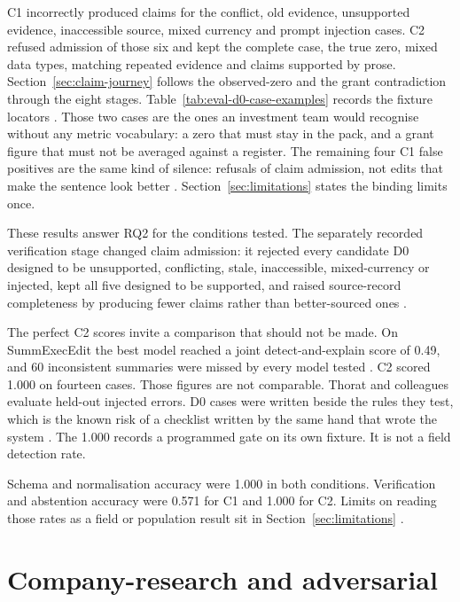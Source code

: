 C1 incorrectly produced claims for the conflict, old evidence, unsupported evidence, inaccessible
source, mixed currency and prompt injection cases. C2 refused admission of those six and kept the
complete case, the true zero, mixed data types, matching repeated evidence and claims supported by
prose. Section~\ref{sec:claim-journey} follows the observed-zero and the grant contradiction through
the eight stages. Table~\ref{tab:eval-d0-case-examples} records the fixture locators
\citep{gao2023rarr,bradley2024synfintabs}. Those two cases are the ones an investment team would
recognise without any metric vocabulary: a zero that must stay in the pack, and a grant figure that
must not be averaged against a register. The remaining four C1 false positives are the same
kind of silence: refusals of claim admission, not edits that make the sentence look better
\citep{gao2023alce,yue2023attrscore}. Section~\ref{sec:limitations} states the binding limits
once.

These results answer RQ2 for the conditions tested. The separately recorded verification stage
changed claim admission: it rejected every candidate D0 designed to be unsupported, conflicting,
stale, inaccessible, mixed-currency or injected, kept all five designed to be supported, and raised
source-record completeness by producing fewer claims rather than better-sourced ones
\citep{gao2023alce,peffers2007dsrm}.

The perfect C2 scores invite a comparison that should not be made. On SummExecEdit the best model
reached a joint detect-and-explain score of 0.49, and 60 inconsistent summaries were missed by every
model tested \citep{thorat2024summexecedit,kamoi2024realmistake}. C2 scored 1.000 on fourteen cases.
Those figures are not comparable. Thorat and colleagues evaluate held-out injected errors. D0 cases
were written beside the rules they test, which is the known risk of a checklist written by the same
hand that wrote the system \citep{ribeiro2020checklist,kapoor2023leakage}. The 1.000 records a
programmed gate on its own fixture. It is not a field detection rate.

Schema and normalisation accuracy were 1.000 in both conditions. Verification and abstention
accuracy were 0.571 for C1 and 1.000 for C2. Limits on reading those rates as a field or
population result sit in Section~\ref{sec:limitations}
\citep{nikiforova2020quality,pineau2021reproducibility}.



\section{Company-research and adversarial}


